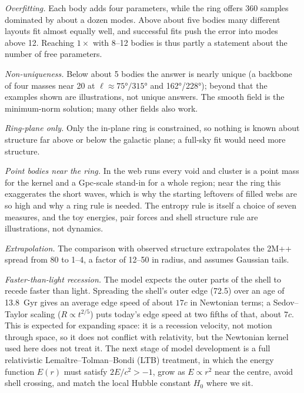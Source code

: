\documentclass[aps,prd,twocolumn,nofootinbib,superscriptaddress,floatfix]{revtex4-2}
\begin{document}
\emph{Overfitting.} Each body adds four parameters, while the ring offers 360 samples dominated by about a dozen modes. Above about five bodies many different layouts fit almost equally well, and successful fits push the error into modes above 12. Reaching $1\times$ with 8--12 bodies is thus partly a statement about the number of free parameters.

\emph{Non-uniqueness.} Below about 5 bodies the answer is nearly unique (a backbone of four masses near \SI{20}{\Gpc} at $\ell\approx\ang{75}/\ang{315}$ and \ang{162}/\ang{228}); beyond that the examples shown are illustrations, not unique answers. The smooth field is the minimum-norm solution; many other fields also work.

\emph{Ring-plane only.} Only the in-plane ring is constrained, so nothing is known about structure far above or below the galactic plane; a full-sky fit would need more structure.

\emph{Point bodies near the ring.} In the web runs every void and cluster is a point mass for the kernel and a Gpc-scale stand-in for a whole region; near the ring this exaggerates the short waves, which is why the starting leftovers of filled webs are so high and why a ring rule is needed. The entropy rule is itself a choice of seven measures, and the toy energies, pair forces and shell structure rule are illustrations, not dynamics.

\emph{Extrapolation.} The comparison with observed structure extrapolates the 2M++ spread from \SI{80}{\Mpc} to \SIrange{1}{4}{\Gpc}, a factor of 12--50 in radius, and assumes Gaussian tails.

\emph{Faster-than-light recession.} The model expects the outer parts of the shell to recede faster than light. Spreading the shell's outer edge (\SI{72.5}{\Gpc}) over an age of \SI{13.8}{Gyr} gives an average edge speed of about $17c$ in Newtonian terms; a Sedov--Taylor scaling ($R\propto t^{2/5}$) puts today's edge speed at two fifths of that, about $7c$. This is expected for expanding space: it is a recession velocity, not motion through space, so it does not conflict with relativity, but the Newtonian kernel used here does not treat it. The next stage of model development is a full relativistic Lema\^itre--Tolman--Bondi (LTB) treatment, in which the energy function $E(r)$ must satisfy $2E/c^2>-1$, grow as $E\propto r^2$ near the centre, avoid shell crossing, and match the local Hubble constant $H_0$ where we sit.
\end{document}
